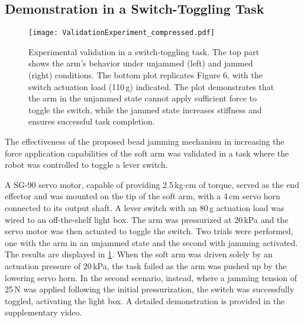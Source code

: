 \subsection{Demonstration in a Switch-Toggling Task}
\begin{figure}[t]
    \centering
    \texttt{[image: ValidationExperiment\_compressed.pdf]}
    \caption{Experimental validation in a switch-toggling task. The top part shows the arm's behavior under unjammed (left) and jammed (right) conditions. The bottom plot replicates Figure 6, with the switch actuation load (110\,g) indicated. The plot demonstrates that the arm in the unjammed state cannot apply sufficient force to toggle the switch, while the jammed state increases stiffness and ensures successful task completion.}
    \label{fig:task}
\end{figure}
The effectiveness of the proposed bead jamming mechanism in increasing the force application capabilities of the soft arm was validated in a task where the robot was controlled to toggle a lever switch.

A SG-90 servo motor, capable of providing 2.5\,kg$\cdot$cm of torque, served as the end effector and was mounted on the tip of the soft arm, with a 4\,cm servo horn connected to its output shaft. A lever switch with an 80\,g actuation load was wired to an off-the-shelf light box. The arm was pressurized at 20\,kPa and the servo motor was then actuated to toggle the switch. Two trials were performed, one with the arm in an unjammed state and the second with jamming activated. The results are displayed in \cref{fig:task}. When the soft arm was driven solely by an actuation pressure of 20\,kPa, the task failed as the arm was pushed up by the lowering servo horn. In the second scenario, instead, where a jamming tension of 25\,N was applied following the initial pressurization,  the switch was successfully toggled, activating the light box. A detailed demonstration is provided in the supplementary video.




